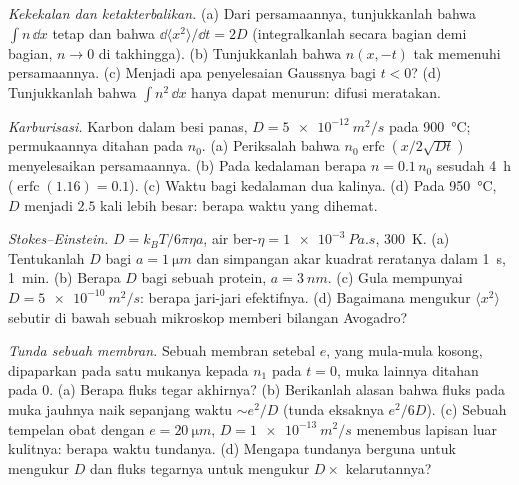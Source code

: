 \begin{exercise}[$\star\star$]\label{exo:b2:particle-diffusion:7}
\emph{Kekekalan dan ketakterbalikan.} (a) Dari persamaannya, tunjukkanlah
bahwa $\int n\,\dd x$ tetap dan bahwa $\dd\langle x^2\rangle/\dd t =
2D$ (integralkanlah secara bagian demi bagian, $n \to 0$ di takhingga). (b) Tunjukkanlah bahwa
$n(x,-t)$ tak memenuhi persamaannya. (c) Menjadi apa penyelesaian
Gaussnya bagi $t < 0$? (d) Tunjukkanlah bahwa $\int n^2\,\dd x$ hanya dapat
menurun: difusi meratakan.
\end{exercise}

\begin{exercise}[$\star\star$]\label{exo:b2:particle-diffusion:8}
\emph{Karburisasi.} Karbon dalam besi panas, $D = \qty{5e-12}{m^2/s}$ pada
\qty{900}{\celsius}; permukaannya ditahan pada $n_0$. (a) Periksalah bahwa $n_0
\operatorname{erfc}(x/2\sqrt{Dt})$ menyelesaikan persamaannya. (b) Pada kedalaman
berapa $n = 0.1\,n_0$ sesudah \qty{4}{h} ($\operatorname{erfc}(1.16) = 0.1$).
(c) Waktu bagi kedalaman dua kalinya. (d) Pada \qty{950}{\celsius}, $D$ menjadi $2.5$
kali lebih besar: berapa waktu yang dihemat.
\end{exercise}

\begin{exercise}[$\star\star$]\label{exo:b2:particle-diffusion:9}
\emph{Stokes--Einstein.} $D = k_BT/6\pi\eta a$, air ber-$\eta =
\qty{1e-3}{Pa.s}$, \qty{300}{K}. (a) Tentukanlah $D$ bagi $a = \qty{1}{\micro m}$ dan
simpangan akar kuadrat reratanya dalam \qty{1}{s}, \qty{1}{min}. (b) Berapa $D$
bagi sebuah protein, $a = \qty{3}{nm}$. (c) Gula mempunyai $D = \qty{5e-10}{m^2/s}$:
berapa jari-jari efektifnya. (d) Bagaimana mengukur $\langle x^2\rangle$ sebutir
di bawah sebuah mikroskop memberi bilangan Avogadro?
\end{exercise}

\begin{exercise}[$\star\star\star$]\label{exo:b2:particle-diffusion:10}
\emph{Tunda sebuah membran.} Sebuah membran setebal $e$, yang mula-mula
kosong, dipaparkan pada satu mukanya kepada $n_1$ pada $t = 0$, muka lainnya ditahan
pada $0$. (a) Berapa fluks tegar akhirnya? (b) Berikanlah alasan bahwa fluks
pada muka jauhnya naik sepanjang waktu $\sim e^2/D$ (tunda eksaknya
$e^2/6D$). (c) Sebuah tempelan obat dengan $e = \qty{20}{\micro m}$, $D =
\qty{1e-13}{m^2/s}$ menembus lapisan luar kulitnya: berapa waktu tundanya. (d) Mengapa
tundanya berguna untuk mengukur $D$ dan fluks tegarnya untuk mengukur
$D \times$ kelarutannya?
\end{exercise}

